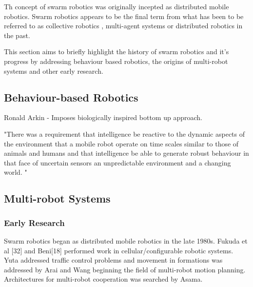 Th concept of swarm robotics was originally incepted as distributed mobile robotics. 
Swarm robotics appears to be the final term from what has been to be referred to as collective robotics \cite{kube1993collective}, multi-agent systems \cite{jennings1993commitments} or distributed robotics \cite{gauthier1987interprocess} in the past. 

This section aims to briefly highlight the history of swarm robotics and it's progress by addressing behaviour based robotics, the origins of multi-robot systems and other early research.

\subsection{Behaviour-based Robotics}
\label{behaviourbasedrobotics}

Ronald Arkin - Imposes biologically inspired bottom up approach. 

"There was a requirement that intelligence be reactive to the dynamic aspects of the environment that a mobile robot operate on time scales similar to those of animals and humans and that intelligence be able to generate robust behaviour in that face of uncertain sensors an unpredictable environment and a changing world. "

\subsection{Multi-robot Systems}
\label{multi-robot systems}



\subsubsection{Early Research}
\label{early-research}

Swarm robotics began as distributed mobile robotics in the late 1980s. Fukuda et al [32] and Beni[18] performed work in cellular/configurable robotic systems. Yuta addressed traffic control problems and movement in formations was addressed by Arai and Wang beginning the field of multi-robot motion planning. Architectures for multi-robot cooperation 
was searched by Asama.




